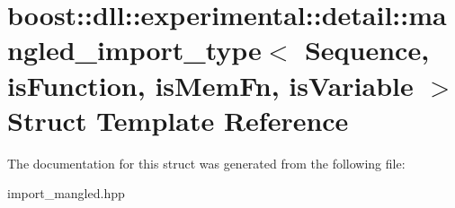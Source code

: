 \hypertarget{a00206}{}\section{boost\+:\+:dll\+:\+:experimental\+:\+:detail\+:\+:mangled\+\_\+import\+\_\+type$<$ Sequence, is\+Function, is\+Mem\+Fn, is\+Variable $>$ Struct Template Reference}
\label{a00206}


The documentation for this struct was generated from the following file\+:\begin{DoxyCompactItemize}
\item 
import\+\_\+mangled.\+hpp\end{DoxyCompactItemize}
